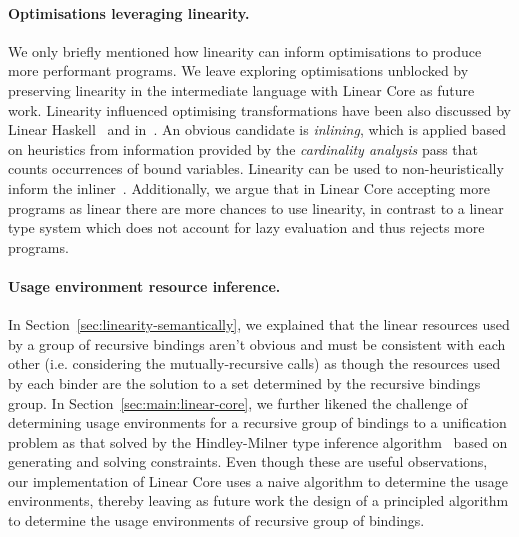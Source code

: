 \documentclass[acmsmall,review,anonymous]{acmart}
\begin{document}


\paragraph{Optimisations leveraging linearity.}
We only briefly mentioned how linearity can inform optimisations to produce
more performant programs. We leave exploring optimisations unblocked by
preserving linearity in the intermediate language with Linear Core as future
work. Linearity influenced optimising transformations have been also discussed
by Linear Haskell~\cite{cite:linearhaskell} and
in~\cite{cite:let-floating,peytonjones1997a}. An obvious candidate is
\emph{inlining}, which is applied based on heuristics from information provided
by the \emph{cardinality analysis} pass that counts occurrences of bound
variables.  Linearity can be used to non-heuristically inform
the inliner~\cite{cite:linearhaskell}. Additionally, we argue that in Linear
Core accepting more programs as linear there are more chances to use linearity,
in contrast to a linear type system which does not account for lazy evaluation
and thus rejects more programs.

\paragraph{Usage environment resource inference.}
In Section~\ref{sec:linearity-semantically}, we explained that the linear
resources used by a group of recursive bindings aren't obvious and must be
consistent with each other (i.e. considering the mutually-recursive calls) as
though the resources used by each binder are the solution to a set determined
by the recursive bindings group.  In Section~\ref{sec:main:linear-core}, we
further likened the challenge of determining usage environments for a recursive
group of bindings to a unification problem as that solved by the Hindley-Milner
type inference algorithm~\cite{DBLP:conf/popl/DamasM82} based on generating and solving
constraints. Even though these are useful observations, our implementation of
Linear Core uses a naive algorithm to determine the usage environments, thereby
leaving as future work the design of a principled algorithm to determine the
usage environments of recursive group of bindings.
\end{document}
